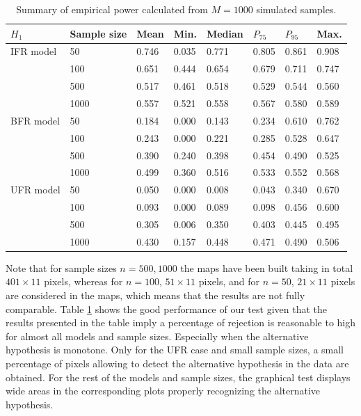 \documentclass[preprint,12pt]{elsarticle}
\begin{document}
\begin{table}[htb]
\centering
\caption{Summary of empirical power calculated from $M=1000$ simulated samples.}
{\begin{tabular}{llllllll} \hline
  $H_1$   & Sample size &   Mean & Min. & Median   & $P_{75}$ & $P_{95}$& Max.\\
\hline
IFR model &50        & 0.746& 0.035 & 0.771 & 0.805  & 0.861 & 0.908\\
          &100       & 0.651& 0.444 & 0.654 & 0.679  & 0.711 & 0.747\\
          &500       & 0.517& 0.461 & 0.518 & 0.529  & 0.544 & 0.560\\
          &1000      & 0.557& 0.521 & 0.558 & 0.567  & 0.580 & 0.589\\ \hline
BFR model &50        & 0.184& 0.000 & 0.143 & 0.234  & 0.610 & 0.762\\
          &100       & 0.243& 0.000 & 0.221 & 0.285  & 0.528 & 0.647\\
          &500       & 0.390& 0.240 & 0.398 & 0.454  & 0.490 & 0.525\\
          &1000      &0.499 & 0.360  & 0.516 & 0.533  & 0.552 & 0.568\\ \hline
UFR model &50        &0.050 & 0.000 & 0.008 & 0.043  & 0.340 & 0.670\\
          &100       &0.093 & 0.000  & 0.089 & 0.098  & 0.456 & 0.600 \\
          &500       &0.305 & 0.006  & 0.350 & 0.403  & 0.445 & 0.495\\
          &1000      &0.430 & 0.157  & 0.448 & 0.471  & 0.490 & 0.506\\ \hline

\end{tabular}}
\label{Tab:power}
\end{table}

Note that for sample sizes $n=500, 1000$ the maps have been built taking in total $401 \times 11$ pixels, whereas for $n=100$, $51 \times 11$ pixels, and for $n=50$, $21 \times 11$ pixels are considered in the maps, which means that the results are not fully comparable. Table \ref{Tab:power} shows the good performance of our test given that the results presented in the table imply a percentage of rejection is reasonable to high for almost all models and sample sizes. Especially when the alternative hypothesis is monotone. Only for the UFR case and small sample sizes, a small percentage of pixels allowing  to detect the alternative hypothesis in the data are obtained. For the rest of the models and sample sizes, the graphical test displays wide areas in the corresponding plots properly recognizing the alternative hypothesis.
\end{document}
